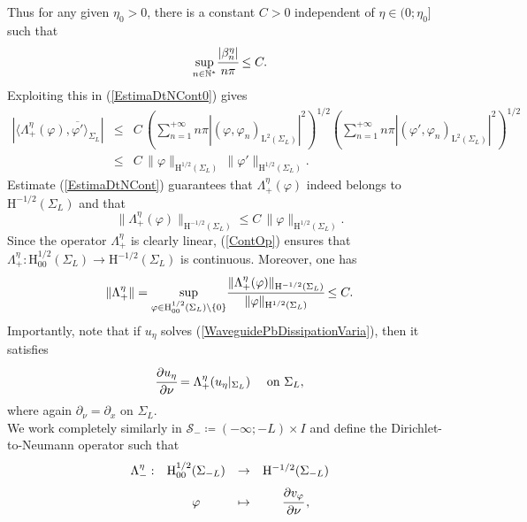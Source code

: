 \documentclass[11pt,a4paper]{report}
\newcommand{\dsp}{\displaystyle}
\newcommand{\mrm}[1]{\mathrm{#1}}
\newcommand{\N}{\mathbb{N}}
\newcommand{\mL}{\mrm{L}}
\newcommand{\mH}{\mrm{H}}
\begin{document}
Thus for any given $\eta_0>0$, there is a constant $C>0$ independent of $\eta\in(0;\eta_0]$ such that
\[
\underset{n\in\N^\ast}{\sup} \cfrac{|\beta_n^\eta|}{n\pi} \le C.
\]
Exploiting this in (\ref{EstimaDtNCont0}) gives
\begin{equation}\label{EstimaDtNCont}
\begin{array}{rcl}
|\langle \Lambda_+^\eta(\varphi),\overline{\varphi'}\rangle_{\Sigma_L}|
&\le & C\,\left(\dsp\sum_{n=1}^{+\infty}n\pi|(\varphi,\varphi_n)_{\mL^2(\Sigma_L)}|^2\right)^{1/2} \left(\dsp\sum_{n=1}^{+\infty}n\pi|(\varphi',\varphi_n)_{\mL^2(\Sigma_L)}|^2\right)^{1/2} \\[14pt]
&\le & C\,\|\varphi\|_{\mH^{1/2}(\Sigma_L)}\,\|\varphi'\|_{\mH^{1/2}(\Sigma_L)}.
\end{array}
\end{equation}
Estimate (\ref{EstimaDtNCont}) guarantees that $\Lambda_+^\eta(\varphi)$ indeed belongs to $\mH^{-1/2}(\Sigma_L)$ and that
\begin{equation}\label{ContOp}
\|\Lambda_+^\eta(\varphi)\|_{\mH^{-1/2}(\Sigma_L)} \le C\,\|\varphi\|_{\mH^{1/2}(\Sigma_L)}.
\end{equation}
Since the operator $\Lambda_+^\eta$ is clearly linear, (\ref{ContOp}) ensures that $\Lambda_+^\eta: \mH^{1/2}_{00}(\Sigma_L)  \to \mH^{-1/2}(\Sigma_L)$ is continuous. Moreover, one has 
\begin{equation}\label{EndContDtN}
\|\Lambda_+^\eta\| = \underset{\varphi\in \mH^{1/2}_{00}(\Sigma_L)\setminus\{0\}}{\sup} \cfrac{\|\Lambda_+^\eta(\varphi)\|_{\mH^{-1/2}(\Sigma_L)}}{\|\varphi\|_{\mH^{1/2}(\Sigma_L)}} \le C.
\end{equation} 
Importantly, note that if $u_\eta$ solves (\ref{WaveguidePbDissipationVaria}), then it satisfies
\begin{equation}\label{CondTransP}
\cfrac{\partial u_\eta}{\partial \nu} =\Lambda_+^\eta( u_\eta|_{\Sigma_L})\quad\mbox{ on }\Sigma_L,
\end{equation}
where again $\partial_\nu=\partial_x$ on $\Sigma_L$.\\
\newline
We work completely similarly in $\mathcal{S}_-\coloneqq(-\infty;-L)\times I$ and define the Dirichlet-to-Neumann operator such that
\[
\begin{array}{lccc}
\Lambda_-^\eta:& \mH^{1/2}_{00}(\Sigma_{-L}) & \to& \mH^{-1/2}(\Sigma_{-L}) \\[6pt]
 & \varphi & \mapsto  & \cfrac{\partial v_{\varphi}}{\partial \nu}\,,
\end{array}
\]
\end{document}
